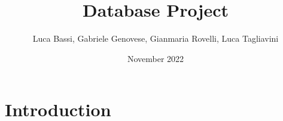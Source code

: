 \documentclass{article}
\title{Database Project}
\author{Luca Bassi, Gabriele Genovese, Gianmaria Rovelli, Luca Tagliavini}
\date{November 2022}
\begin{document}
\maketitle

\section{Introduction}
\end{document}
